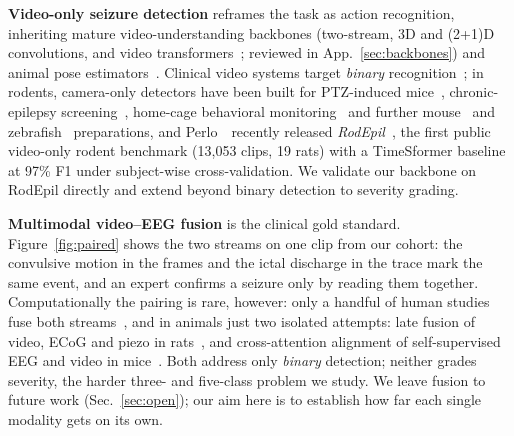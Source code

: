 \noindent\textbf{Video-only seizure detection} reframes the task as action
recognition, inheriting mature video-understanding backbones (two-stream, 3D and
(2+1)D convolutions, and video transformers~\cite{simonyan2014twostream,
carreira2017i3d,tran2018r2plus1d,feichtenhofer2019slowfast,
bertasius2021timesformer,tong2022videomae}; reviewed in App.~\ref{sec:backbones})
and animal pose
estimators~\cite{mathis2018deeplabcut,pereira2022sleap}. Clinical video systems
target \emph{binary} recognition~\cite{ahmedt2018,karacsony2020seizure,vsvig2024};
in rodents, camera-only detectors have been built for PTZ-induced
mice~\cite{sabnis2024}, chronic-epilepsy screening~\cite{epidetect2024}, home-cage
behavioral monitoring~\cite{jankovic2019homecage} and further mouse~\cite{khan2024mice}
and zebrafish~\cite{whytefagundes2025zebrafish} preparations, and
Perlo~\etal\ recently released \emph{RodEpil}~\cite{rodepil2025}, the first public
video-only rodent benchmark (13{,}053 clips, 19 rats) with a TimeSformer baseline
at 97\% F1 under subject-wise cross-validation. We validate our backbone on
RodEpil directly and extend beyond binary detection to severity grading.

\noindent\textbf{Multimodal video--EEG fusion} is the clinical gold standard.
Figure~\ref{fig:paired} shows the two streams on one clip from our cohort: the
convulsive motion in the frames and the ictal discharge in the trace mark the same
event, and an expert confirms a seizure only by reading them together.
Computationally the pairing is rare, however: only a handful of human studies fuse
both streams~\cite{aghaei_video_eeg,martini2021,cao2024,vepinet2024}, and in animals
just two isolated attempts: late fusion of video, ECoG and piezo in
rats~\cite{mullen2024}, and cross-attention alignment of self-supervised EEG and
video in mice~\cite{eegvfusion2026}. Both address only \emph{binary} detection;
neither grades severity, the harder three- and five-class problem we study. We leave fusion to future work (Sec.~\ref{sec:open}); our aim here is to establish
how far each single modality gets on its own.
